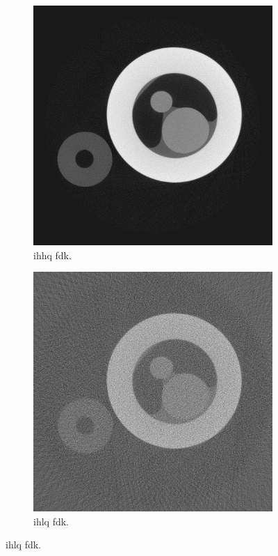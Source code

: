 \begin{figure}
    \begin{subfigure}[t]{.45\textwidth}
      \centering
      \includegraphics[width=\linewidth]{figures/kimrobertgt.png}
      \caption{\acrlong{ihhq} \gls{fdk}. }
    \end{subfigure}
    \hfill
    \begin{subfigure}[t]{.45\textwidth}
      \centering
      \includegraphics[width=\linewidth]{figures/kimrobertFDK.png}
      \caption{\acrlong{ihlq} \gls{fdk}.}
    \end{subfigure}
  

\end{figure}
